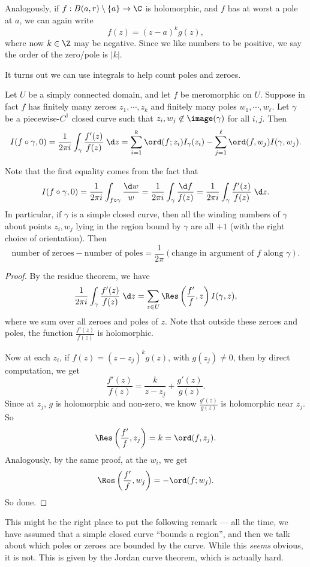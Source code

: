 \documentclass[a4paper]{article}
\begin{document}
Analogously, if $f: B(a, r) \setminus \{a\} \to \C$ is holomorphic, and $f$ has at worst a pole at $a$, we can again write
\[
  f(z) = (z - a)^k g(z),
\]
where now $k \in \Z$ may be negative. Since we like numbers to be positive, we say the order of the zero/pole is $|k|$.

It turns out we can use integrals to help count poles and zeroes.

\begin{thm}
  Let $U$ be a simply connected domain, and let $f$ be meromorphic on $U$. Suppose in fact $f$ has finitely many zeroes $z_1, \cdots, z_k$ and finitely many poles $w_1, \cdots, w_\ell$. Let $\gamma$ be a piecewise-$C^1$ closed curve such that $z_i, w_j \not\in \image(\gamma)$ for all $i, j$. Then
  \[
    I(f \circ \gamma, 0) = \frac{1}{2\pi i}\int_\gamma \frac{f'(z)}{f(z)}\;\d z = \sum_{i = 1}^k \ord(f; z_i) I_\gamma(z_i) - \sum_{j = 1}^\ell \ord(f, w_j) I(\gamma, w_j).
  \]
\end{thm}
Note that the first equality comes from the fact that
\[
  I(f \circ \gamma, 0) = \frac{1}{2\pi i} \int_{f \circ \gamma} \frac{\d w}{w} = \frac{1}{2\pi i}\int_\gamma \frac{\d f}{f(z)} = \frac{1}{2\pi i} \int_\gamma \frac{f'(z)}{f(z)}\;\d z.
\]
In particular, if $\gamma$ is a simple closed curve, then all the winding numbers of $\gamma$ about points $z_i, w_j$ lying in the region bound by $\gamma$ are all $+1$ (with the right choice of orientation). Then
\[
  \text{number of zeroes} - \text{number of poles} = \frac{1}{2\pi} (\text{change in argument of $f$ along $\gamma$}).
\]

\begin{proof}
  By the residue theorem, we have
  \[
    \frac{1}{2\pi i}\int_\gamma \frac{f'(z)}{f(z)}\;\d z = \sum_{z \in U} \Res\left(\frac{f'}{f}, z\right) I(\gamma, z),
  \]
  where we sum over all zeroes and poles of $z$. Note that outside these zeroes and poles, the function $\frac{f'(z)}{f(z)}$ is holomorphic.

  Now at each $z_i$, if $f(z) = (z - z_j)^k g(z)$, with $g(z_j) \not= 0$, then by direct computation, we get
  \[
    \frac{f'(z)}{f(z)} = \frac{k}{z - z_j} + \frac{g'(z)}{g(z)}.
  \]
  Since at $z_j$, $g$ is holomorphic and non-zero, we know $\frac{g'(z)}{g(z)}$ is holomorphic near $z_j$. So
  \[
    \Res\left(\frac{f'}{f}, z_j\right) = k = \ord(f, z_j).
  \]
  Analogously, by the same proof, at the $w_i$, we get
  \[
    \Res\left(\frac{f'}{f}, w_j\right) = -\ord(f; w_j).
  \]
  So done.
\end{proof}
This might be the right place to put the following remark --- all the time, we have assumed that a simple closed curve ``bounds a region'', and then we talk about which poles or zeroes are bounded by the curve. While this \emph{seems} obvious, it is not. This is given by the Jordan curve theorem, which is actually hard.
\end{document}
